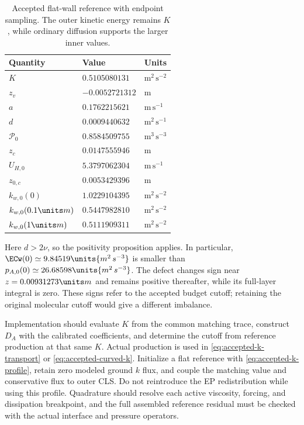 \begin{table}[htbp]
\centering\small
\begin{tabular}{@{}lll@{}}
\toprule
Quantity & Value & Units\\
\midrule
$K$ & $0.5105080131$ & $\mathrm{m^2\,s^{-2}}$\\
$z_v$ & $-0.0052721312$ & $\mathrm m$\\
$a$ & $0.1762215621$ & $\mathrm{m\,s^{-1}}$\\
$d$ & $0.0009440632$ & $\mathrm{m^2\,s^{-1}}$\\
$\mathcal P_0$ & $0.8584509755$ & $\mathrm{m^3\,s^{-3}}$\\
$z_c$ & $0.0147555946$ & $\mathrm m$\\
$U_{H,0}$ & $5.3797062304$ & $\mathrm{m\,s^{-1}}$\\
$z_{0,c}$ & $0.0053429396$ & $\mathrm m$\\
$k_{w,0}(0)$ & $1.0229104395$ & $\mathrm{m^2\,s^{-2}}$\\
$k_{w,0}(0.1\units m)$ & $0.5447982810$ & $\mathrm{m^2\,s^{-2}}$\\
$k_{w,0}(1\units m)$ & $0.5111909311$ & $\mathrm{m^2\,s^{-2}}$\\
\bottomrule
\end{tabular}
\caption{Accepted flat-wall reference with endpoint sampling.
The outer kinetic energy remains $K$, while ordinary diffusion
supports the larger inner values.}
\label{tab:accepted-reference}
\end{table}

Here $d>2\nu$, so the positivity proposition applies. In particular,
$\ECw(0)\simeq9.84519\units{m^2\,s^{-3}}$ is smaller than
$p_{A,0}(0)\simeq26.68598\units{m^2\,s^{-3}}$.
The defect changes sign near $z=0.00931273\units m$ and remains
positive thereafter, while its full-layer integral is zero.
These signs refer to the accepted budget cutoff; retaining the
original molecular cutoff would give a different imbalance.

Implementation should evaluate $K$ from the common matching trace,
construct $D_A$ with the calibrated coefficients, and determine
the cutoff from reference production at that same $K$.
Actual production is used in \cref{eq:accepted-k-transport} or
\cref{eq:accepted-curved-k}. Initialize a flat reference with
\cref{eq:accepted-k-profile}, retain zero modeled ground $k$ flux,
and couple the matching value and conservative flux to outer CLS.
Do not reintroduce the EP redistribution while using this profile.
Quadrature should resolve each active viscosity, forcing, and
dissipation breakpoint, and the full assembled reference residual
must be checked with the actual interface and pressure operators.

